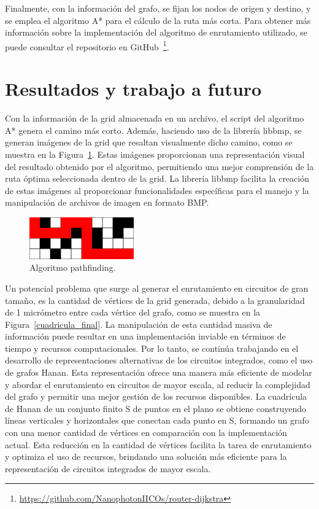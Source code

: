 \documentclass[reprint,amsmath,amssymb,aps]{revtex4-2}
\begin{document}
Finalmente, con la información del grafo, se fijan los nodos de origen y destino, y se emplea el algoritmo A* para el cálculo de la ruta más corta. Para obtener más información sobre la implementación del algoritmo de enrutamiento utilizado, se puede consultar el repositorio en GitHub~\footnote{\url{https://github.com/NanophotonIICOs/router-dijkstra}}.


\section{Resultados y trabajo a futuro}

Con la información de la grid almacenada en un archivo, el script del algoritmo A* genera el camino más corto. Además, haciendo uso de la librería libbmp, se generan imágenes de la grid que resaltan visualmente dicho camino, como se muestra en la Figura~\ref{cuadricula_final2}. Estas imágenes proporcionan una representación visual del resultado obtenido por el algoritmo, permitiendo una mejor comprensión de la ruta óptima seleccionada dentro de la grid. La librería libbmp facilita la creación de estas imágenes al proporcionar funcionalidades específicas para el manejo y la manipulación de archivos de imagen en formato BMP.

\begin{figure}[H]
	\centering
	\includegraphics[width=0.4\textwidth]{cuadricula_final2.png}
	\caption{Algoritmo pathfinding.}
	\label{cuadricula_final2}
\end{figure}

Un potencial problema que surge al generar el enrutamiento en circuitos de gran tamaño, es la cantidad de vértices de la grid generada, debido a la granularidad de 1 micrómetro entre cada vértice del grafo, como se muestra en la Figura~\ref{cuadricula_final}. La manipulación de esta cantidad masiva de información puede resultar en una implementación inviable en términos de tiempo y recursos computacionales. Por lo tanto, se continúa trabajando en el desarrollo de representaciones alternativas de los circuitos integrados, como el uso de grafos Hanan. Esta representación ofrece una manera más eficiente de modelar y abordar el enrutamiento en circuitos de mayor escala, al reducir la complejidad del grafo y permitir una mejor gestión de los recursos disponibles. La cuadrícula de Hanan de un conjunto finito S de puntos en el plano se obtiene construyendo líneas verticales y horizontales que conectan cada punto en S, formando un grafo con una menor cantidad de vértices en comparación con la implementación actual. Esta reducción en la cantidad de vértices facilita la tarea de enrutamiento y optimiza el uso de recursos, brindando una solución más eficiente para la representación de circuitos integrados de mayor escala.
\end{document}
